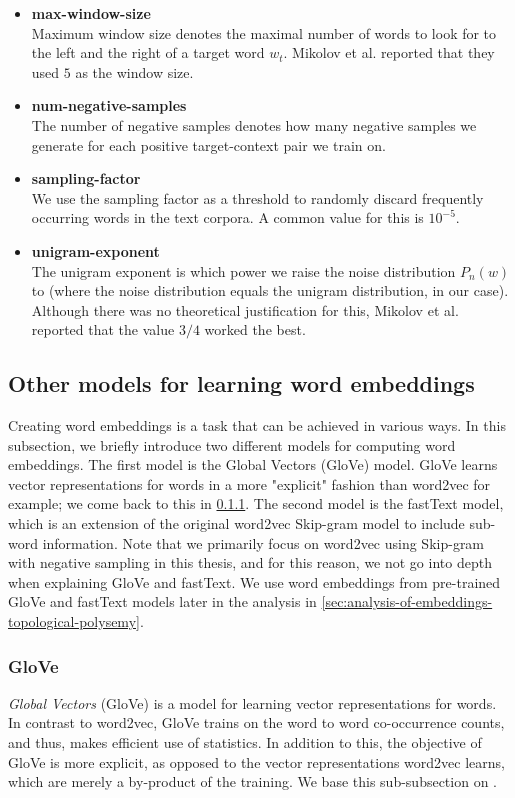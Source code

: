 \begin{itemize}
    \item \textbf{max-window-size} \\
        Maximum window size denotes the maximal number of words to look for to the left and the right of a target word $w_t$. Mikolov et al. reported that they used $5$ as the window size.
    \item \textbf{num-negative-samples} \\
        The number of negative samples denotes how many negative samples we generate for each positive target-context pair we train on.
    \item \textbf{sampling-factor} \\
        We use the sampling factor as a threshold to randomly discard frequently occurring words in the text corpora. A common value for this is $10^{-5}$.
    \item \textbf{unigram-exponent} \\
        The unigram exponent is which power we raise the noise distribution $P_n(w)$ to (where the noise distribution equals the unigram distribution, in our case). Although there was no theoretical justification for this, Mikolov et al. reported that the value $3/4$ worked the best.
\end{itemize}

\subsection{Other models for learning word embeddings}
\label{sec:other-models-for-learning-word-embeddings}
Creating word embeddings is a task that can be achieved in various ways. In this subsection, we briefly introduce two different models for computing word embeddings. The first model is the Global Vectors (GloVe) \cite{pennington2014glove} model. GloVe learns vector representations for words in a more "explicit" fashion than word2vec for example; we come back to this in \cref{sec:glove}. The second model is the fastText \cite{bojanowski2017enriching} model, which is an extension of the original word2vec Skip-gram model to include sub-word information. Note that we primarily focus on word2vec using Skip-gram with negative sampling in this thesis, and for this reason, we not go into depth when explaining GloVe and fastText. We use word embeddings from pre-trained GloVe and fastText models later in the analysis in \cref{sec:analysis-of-embeddings-topological-polysemy}.

\subsubsection{GloVe}
\label{sec:glove}
\textit{Global Vectors} (GloVe) \cite{pennington2014glove} is a model for learning vector representations for words. In contrast to word2vec, GloVe trains on the word to word co-occurrence counts, and thus, makes efficient use of statistics. In addition to this, the objective of GloVe is more explicit, as opposed to the vector representations word2vec learns, which are merely a by-product of the training. We base this sub-subsection on \cite{pennington2014glove}.


